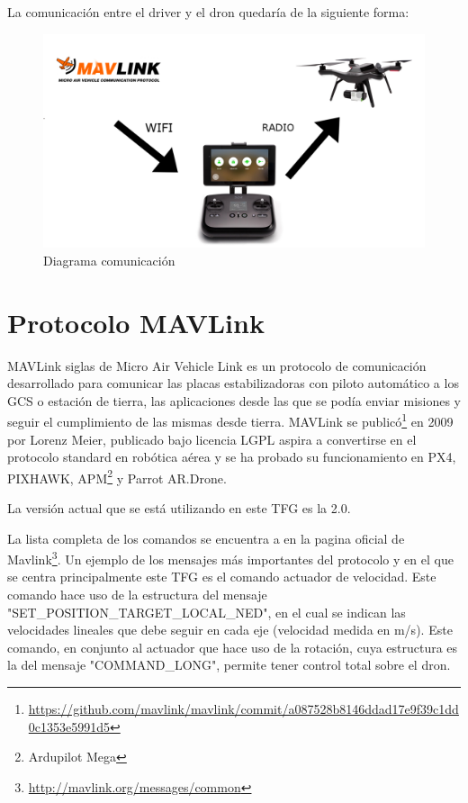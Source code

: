 La comunicación entre el driver y el dron quedaría de la siguiente forma:

\begin{figure}[H]
  \centering
  \includegraphics[scale=0.15]{imagenes/diagramaComunicacion.jpg}
  \caption{Diagrama comunicación}
  \label{fig:diagrama}
\end{figure}

\section{Protocolo MAVLink}
\label{sec:mavlink}

MAVLink\cite{mavlink} siglas de Micro Air Vehicle Link es un protocolo de comunicación desarrollado para comunicar las placas estabilizadoras con piloto automático a los GCS o estación de tierra, las aplicaciones desde las que se podía enviar misiones y seguir el cumplimiento de las mismas desde tierra.
MAVLink se publicó\footnote{\url{https://github.com/mavlink/mavlink/commit/a087528b8146ddad17e9f39c1dd0c1353e5991d5}} en 2009 por Lorenz Meier, publicado bajo licencia LGPL aspira a convertirse en el protocolo standard en robótica aérea y se ha probado su funcionamiento en PX4, PIXHAWK, APM\footnote{Ardupilot Mega} y Parrot AR.Drone.

La versión actual que se está utilizando en este TFG es la 2.0.


La lista completa de los comandos se encuentra a en la pagina oficial de Mavlink\footnote{\url{http://mavlink.org/messages/common}}. Un ejemplo de los mensajes más importantes del protocolo y en el que se centra principalmente este TFG es el comando actuador de velocidad. Este comando hace uso de la estructura del mensaje "SET\_POSITION\_TARGET\_LOCAL\_NED", en el cual se indican las velocidades lineales que debe seguir en cada eje (velocidad medida en m/s). Este comando, en conjunto al actuador que hace uso de la rotación, cuya estructura es la del mensaje "COMMAND\_LONG", permite tener control total sobre el dron. 


